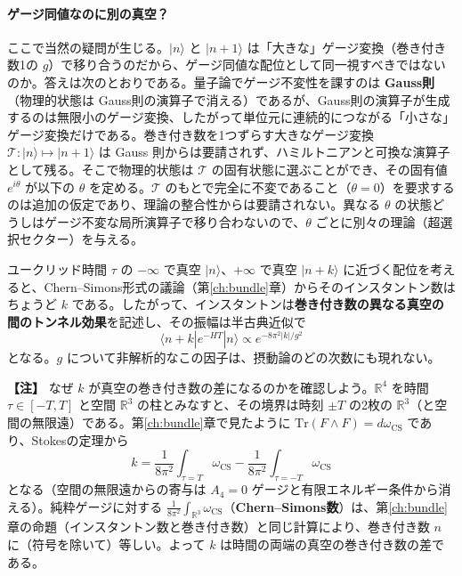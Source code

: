 \documentclass[uplatex, dvipdfmx, book]{jsbook}
\newenvironment{note}{\vspace{1ex}\par\footnotesize\noindent\textbf{【注】}}{\par\vspace{1ex}}
\begin{document}
\paragraph{ゲージ同値なのに別の真空？}
ここで当然の疑問が生じる。$|n\rangle$ と $|n + 1\rangle$ は「大きな」ゲージ変換（巻き付き数1の $g$）で移り合うのだから、ゲージ同値な配位として同一視すべきではないのか。答えは次のとおりである。量子論でゲージ不変性を課すのは \textbf{Gauss則}（物理的状態は Gauss則の演算子で消える）であるが、Gauss則の演算子が生成するのは無限小のゲージ変換、したがって単位元に連続的につながる「小さな」ゲージ変換だけである。巻き付き数を1つずらす大きなゲージ変換 $\mathcal{T}: |n\rangle \mapsto |n + 1\rangle$ は Gauss 則からは要請されず、ハミルトニアンと可換な演算子として残る。そこで物理的状態は $\mathcal{T}$ の固有状態に選ぶことができ、その固有値 $e^{i\theta}$ が以下の $\theta$ を定める。$\mathcal{T}$ のもとで完全に不変であること（$\theta = 0$）を要求するのは追加の仮定であり、理論の整合性からは要請されない。異なる $\theta$ の状態どうしはゲージ不変な局所演算子で移り合わないので、$\theta$ ごとに別々の理論（超選択セクター）を与える。

ユークリッド時間 $\tau$ の $-\infty$ で真空 $|n\rangle$、$+\infty$ で真空 $|n + k\rangle$ に近づく配位を考えると、Chern--Simons形式の議論（第\ref{ch:bundle}章）からそのインスタントン数はちょうど $k$ である。したがって、インスタントンは\textbf{巻き付き数の異なる真空の間のトンネル効果}を記述し、その振幅は半古典近似で
\begin{equation}
    \langle n + k | e^{-HT} | n \rangle \propto e^{-8\pi^2 |k|/g^2}
\end{equation}
となる。$g$ について非解析的なこの因子は、摂動論のどの次数にも現れない。

\begin{note}
なぜ $k$ が真空の巻き付き数の差になるのかを確認しよう。$\mathbb{R}^4$ を時間 $\tau \in [-T, T]$ と空間 $\mathbb{R}^3$ の柱とみなすと、その境界は時刻 $\pm T$ の2枚の $\mathbb{R}^3$（と空間の無限遠）である。第\ref{ch:bundle}章で見たように $\mathrm{Tr}(F \wedge F) = d\omega_{\text{CS}}$ であり、Stokesの定理から
\begin{equation*}
    k = \frac{1}{8\pi^2}\int_{\tau = T} \omega_{\text{CS}} - \frac{1}{8\pi^2}\int_{\tau = -T} \omega_{\text{CS}}
\end{equation*}
となる（空間の無限遠からの寄与は $A_4 = 0$ ゲージと有限エネルギー条件から消える）。純粋ゲージに対する $\frac{1}{8\pi^2}\int_{\mathbb{R}^3}\omega_{\text{CS}}$（\textbf{Chern--Simons数}）は、第\ref{ch:bundle}章の命題（インスタントン数と巻き付き数）と同じ計算により、巻き付き数 $n$ に（符号を除いて）等しい。よって $k$ は時間の両端の真空の巻き付き数の差である。
\end{note}
\end{document}
